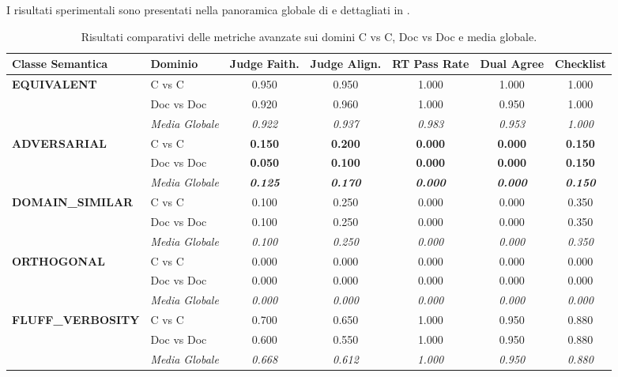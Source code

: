 I risultati sperimentali sono presentati nella panoramica globale di  e dettagliati in .

\begin{table}[htbp]
\centering
\scriptsize
\setlength{\tabcolsep}{3pt}
\caption{Risultati comparativi delle metriche avanzate sui domini C vs C, Doc vs Doc e media globale.}
\label{tab:advanced_metrics_summary}
\begin{tabular}{llccccc}
\toprule
\textbf{Classe Semantica} & \textbf{Dominio} & \textbf{Judge Faith.} & \textbf{Judge Align.} & \textbf{RT Pass Rate} & \textbf{Dual Agree} & \textbf{Checklist} \\
\midrule
\multirow{3}{*}{\textbf{EQUIVALENT}} 
  & C vs C & 0.950 & 0.950 & 1.000 & 1.000 & 1.000 \\
  & Doc vs Doc & 0.920 & 0.960 & 1.000 & 0.950 & 1.000 \\
  & \emph{Media Globale} & \emph{0.922} & \emph{0.937} & \emph{0.983} & \emph{0.953} & \emph{1.000} \\
\midrule
\multirow{3}{*}{\textbf{ADVERSARIAL}} 
  & C vs C & \textbf{0.150} & \textbf{0.200} & \textbf{0.000} & \textbf{0.000} & \textbf{0.150} \\
  & Doc vs Doc & \textbf{0.050} & \textbf{0.100} & \textbf{0.000} & \textbf{0.000} & \textbf{0.150} \\
  & \emph{Media Globale} & \textbf{\emph{0.125}} & \textbf{\emph{0.170}} & \textbf{\emph{0.000}} & \textbf{\emph{0.000}} & \textbf{\emph{0.150}} \\
\midrule
\multirow{3}{*}{\textbf{DOMAIN\_SIMILAR}} 
  & C vs C & 0.100 & 0.250 & 0.000 & 0.000 & 0.350 \\
  & Doc vs Doc & 0.100 & 0.250 & 0.000 & 0.000 & 0.350 \\
  & \emph{Media Globale} & \emph{0.100} & \emph{0.250} & \emph{0.000} & \emph{0.000} & \emph{0.350} \\
\midrule
\multirow{3}{*}{\textbf{ORTHOGONAL}} 
  & C vs C & 0.000 & 0.000 & 0.000 & 0.000 & 0.000 \\
  & Doc vs Doc & 0.000 & 0.000 & 0.000 & 0.000 & 0.000 \\
  & \emph{Media Globale} & \emph{0.000} & \emph{0.000} & \emph{0.000} & \emph{0.000} & \emph{0.000} \\
\midrule
\multirow{3}{*}{\textbf{FLUFF\_VERBOSITY}} 
  & C vs C & 0.700 & 0.650 & 1.000 & 0.950 & 0.880 \\
  & Doc vs Doc & 0.600 & 0.550 & 1.000 & 0.950 & 0.880 \\
  & \emph{Media Globale} & \emph{0.668} & \emph{0.612} & \emph{1.000} & \emph{0.950} & \emph{0.880} \\
\bottomrule
\end{tabular}
\end{table}

